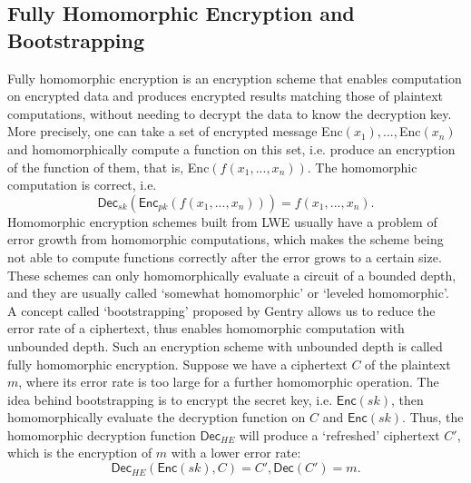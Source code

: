     \subsection{Fully Homomorphic Encryption and Bootstrapping} 
    Fully homomorphic encryption is an encryption scheme that enables computation on encrypted data and produces encrypted results matching those of plaintext computations, without needing to decrypt the data to know the decryption key. More precisely, one can take a set of encrypted message \textsf{Enc}$(x_1),...,$\textsf{Enc}$(x_n)$ and  homomorphically compute a function on this set, i.e.  produce an encryption of the function of them, that is, \textsf{Enc}$(f(x_1,...,x_n))$. The homomorphic computation is correct, i.e. 
    \[
    \textsf{Dec}_{sk}(\textsf{Enc}_{pk}(f(x_1,...,x_n))) = f(x_1,...,x_n).
    \]
    Homomorphic encryption schemes built from LWE usually have a problem of error growth from homomorphic computations, which makes the scheme being not able to compute functions correctly after the error grows to a certain size. These schemes can only homomorphically evaluate a circuit of a bounded depth, and they are usually called `somewhat homomorphic' or `leveled homomorphic'.\\
    A concept called `bootstrapping' proposed by Gentry \cite{bootstrapping} allows us to reduce the error rate of a ciphertext, thus enables homomorphic computation with unbounded depth. Such an encryption scheme with unbounded depth is called fully homomorphic encryption. Suppose we have a ciphertext $C$ of the plaintext $m$, where its error rate is too large for a further homomorphic operation. The idea behind bootstrapping is to encrypt the secret key, i.e. $\textsf{Enc}(sk)$, then homomorphically evaluate the decryption function on $C$ and $\textsf{Enc}(sk)$. Thus, the homomorphic decryption function $\textsf{Dec}_{HE}$ will produce a `refreshed' ciphertext $C'$, which is the encryption of $m$ with a lower error rate:
    \[
    \textsf{Dec}_{HE}(\textsf{Enc}(sk), C) = C', \textsf{Dec}(C') = m.
    \]
